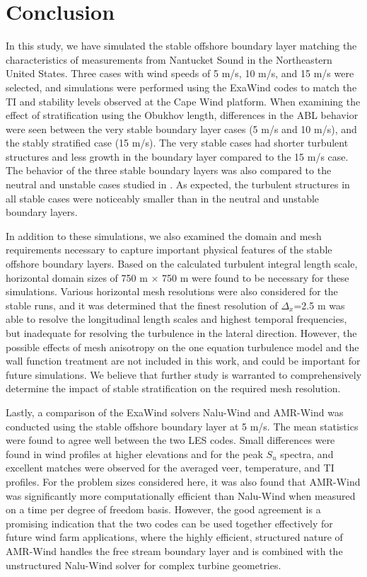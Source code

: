 \documentclass[conf]{new-aiaa}
\begin{document}
\section{Conclusion}
In this study, we have simulated the stable offshore boundary layer matching the
characteristics of measurements from Nantucket Sound in the Northeastern United
States. Three cases with wind speeds of 5 m/s, 10 m/s, and 15 m/s were
selected, and simulations were performed using the ExaWind codes to match the TI
and stability levels observed at the Cape Wind platform.  When examining
the effect of stratification using the Obukhov length, differences in the ABL
behavior were seen between the very stable boundary layer cases (5 m/s and 10
m/s), and the stably stratified case (15 m/s).  The very stable cases had
shorter turbulent structures and less growth in the boundary layer compared to
the 15 m/s case.  The behavior of the three stable boundary layers was also
compared to the neutral and unstable cases studied in \cite{cheung2020large}.
As expected, the turbulent structures in all stable cases were noticeably
smaller than in the neutral and unstable boundary layers.

In addition to these simulations, we also examined the domain and mesh
requirements necessary to capture important physical features of the
stable offshore boundary layers.  Based on the calculated turbulent
integral length scale, horizontal domain sizes of 750 m $\times$ 750 m
were found to be necessary for these simulations.  Various horizontal
mesh resolutions were also considered for the stable runs, and it was
determined that the finest resolution of $\Delta_x$=2.5 m was able to
resolve the longitudinal length scales and highest temporal
frequencies, but inadequate for resolving the turbulence in the
lateral direction.  However, the possible effects of mesh anisotropy
on the one equation turbulence model and the wall function treatment
are not included in this work, and could be important for future
simulations.  We believe that further study is warranted to
comprehensively determine the impact of stable stratification on the
required mesh resolution.

Lastly, a comparison of the ExaWind solvers Nalu-Wind and AMR-Wind was
conducted using the stable offshore boundary layer at 5 m/s.  The mean
statistics were found to agree well between the two LES codes.  Small
differences were found in wind profiles at higher elevations and for
the peak $S_u$ spectra, and excellent matches were observed for the
averaged veer, temperature, and TI profiles.  For the problem sizes
considered here, it was also found that AMR-Wind was significantly
more computationally efficient than Nalu-Wind when measured on a time
per degree of freedom basis.  However, the good agreement is a
promising indication that the two codes can be used together
effectively for future wind farm applications, where the highly
efficient, structured nature of AMR-Wind handles the free stream
boundary layer and is combined with the unstructured Nalu-Wind solver
for complex turbine geometries.
\end{document}
